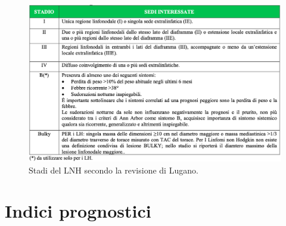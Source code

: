 \begin{figure}[H]
    \begin{center}
    \includegraphics[width=0.95\columnwidth]{img/LUGANOAIOM.png}
    \vspace{-3mm}
    \end{center}
    \caption{Stadi del LNH secondo la revisione di Lugano.
    \cite{AIOM}}
    \label{fig:FIGURE_2.15}
\end{figure}


\section{Indici prognostici}

